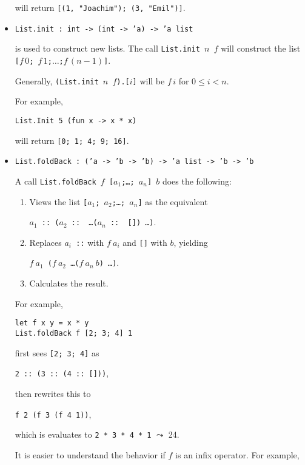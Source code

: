 \documentclass[a4paper]{article}
\begin{document}
\begin{itemize}
will return \texttt{[(1, "Joachim"); (3, "Emil")]}.


\item \texttt{List.init : int -> (int -> 'a) -> 'a list}

is used to construct new lists.  The call \texttt{List.init\,$n$\,$f$}
will construct the list \texttt{[$f\,0$; $f\,1$;$\ldots$;$f\,(n{-}1)$]}.

Generally, \texttt{(List.init\,$n$\,$f$).[$i$]} will be $f\,i$ for
$0\leq i < n$.

For example,

\begin{verbatim}
List.Init 5 (fun x -> x * x)
\end{verbatim}

will return \texttt{[0; 1; 4; 9; 16]}.

\item \texttt{List.foldBack : ('a -> 'b -> 'b) -> 'a list -> 'b -> 'b}

A call \texttt{List.foldBack $f$ [$a_1$;\ldots; $a_n$] $b$} does the
following:

\begin{enumerate}[1.]
\item Views the list \texttt{[$a_1$; $a_2$;\ldots; $a_n$]} as the
  equivalent


  \texttt{$a_1$\,::\,($a_2$\,::\,\,\ldots  ($a_n$\,::\,\,[])  \ldots)}.

\item Replaces \texttt{$a_i$\,::} with $f~a_i$ and \texttt{[]} with
  $b$, yielding

\texttt{$f~a_1$ ($f~a_2$ \ldots  ($f~a_n~b$)  \ldots)}.


\item Calculates the result.

\end{enumerate}

For example,

\begin{verbatim}
let f x y = x * y
List.foldBack f [2; 3; 4] 1
\end{verbatim}

first sees \texttt{[2; 3; 4]} as

\texttt{2\,::\,(3\,::\,(4\,::\,[]))},

then rewrites this to 

\texttt{f 2 (f 3 (f 4 1))},

which is evaluates to \texttt{2 * 3 * 4 * 1} $\leadsto$ 24.

It is easier to understand the behavior if $f$ is an infix operator.
For example, 



\end{itemize}
\end{document}
